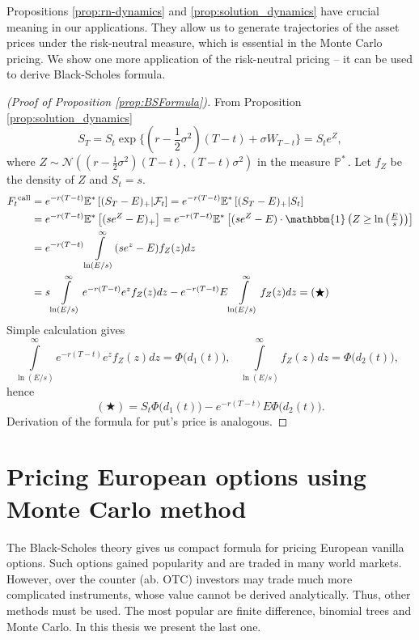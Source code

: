 \documentclass[a4paper,11pt, twoside]{book}
\theoremstyle{definition}
\theoremstyle{remark}
\def\Em{{\mathbb{E}^*}}
\def\Pm{{\mathbb{P}}^*\,}
\begin{document}
Propositions \ref{prop:rn-dynamics} and \ref{prop:solution_dynamics} have crucial meaning in our applications. They allow us to generate trajectories of the asset prices under the risk-neutral measure, which is essential in the Monte Carlo pricing. We show one more application of the risk-neutral pricing -- it can be used to derive Black-Scholes formula.
\begin{proof}[(Proof of Proposition \ref{prop:BSFormula})]
 From Proposition \ref{prop:solution_dynamics}
 \[ S_T = S_t \exp\bigl\{ (r - \frac{1}{2} \sigma^2)(T-t) + \sigma W_{T-t} \bigr\} = S_t e^Z, \]
 where $Z \sim \mathcal{N}\left((r - \frac{1}{2} \sigma^2)(T-t), (T-t)\sigma^2 \right)$ in the measure $\Pm$. Let $f_Z$ be the density of $Z$ and $S_t = s$.
 \begin{equation*}
  \begin{split}
    F_t\textsuperscript{call} &= e^{-r(T-t)} \Em\left[(S_T-E)_+ | \mathcal{F}_t \right] = e^{-r(T-t)} \Em\left[(S_T-E)_+ |S_t\right] \\
    &= e^{-r(T-t)} \Em\left[(s e^Z-E)_+ \right] = e^{-r(T-t)} \Em\left[(s e^Z-E) \cdot \mathbbm{1}\left({\textstyle Z \geq \ln\left(\frac{E}{s}\right)} \right) \right] \\
    &= e^{-r(T-t)} \int\limits_{\ln(E/s)}^\infty (se^z - E)f_Z(z) dz \\
    &= s\int\limits_{\ln(E/s)}^\infty e^{-r(T-t)}e^z f_Z(z) dz - e^{-r(T-t)} E\int\limits_{\ln(E/s)}^\infty f_Z(z) dz = (\bigstar)
  \end{split}
 \end{equation*}
 Simple calculation gives
 \[ \int\limits_{\ln(E/s)}^\infty e^{-r(T-t)}e^z f_Z(z) dz = \Phi\bigl( d_1(t) \bigr),  \ \ \ 
    \int\limits_{\ln(E/s)}^\infty f_Z(z) dz = \Phi\bigl( d_2(t) \bigr),  \ \ \ \]
 hence 
 \[ (\bigstar) = S_t \Phi\bigl( d_1(t) \bigr)  - e^{-r(T-t)} E \Phi\bigl( d_2(t) \bigr) . \]
 Derivation of the formula for put's price is analogous.
\end{proof}




\chapter[{Pricing European options using Monte Carlo method}]{Pricing European options using \\Monte Carlo method}
The Black-Scholes theory gives us compact formula for pricing European vanilla options. Such options gained popularity and are traded in many world markets. However, over the counter (ab. OTC) investors may trade much more complicated instruments, whose value cannot be derived analytically. Thus, other methods must be used.
The most popular are finite difference, binomial trees and Monte Carlo. In this thesis we present the last one.
\end{document}
